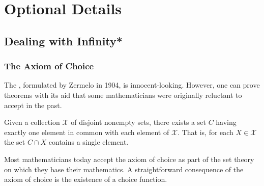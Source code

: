 \chapter{Optional Details}


\section{Dealing with Infinity*}

\subsection{The Axiom of Choice}

The , formulated by Zermelo in 1904, is innocent-looking.
However, one can prove theorems with its aid that some mathematicians were originally reluctant to accept in the past.

\begin{definition}
Given a collection $\mathcal{X}$ of disjoint nonempty sets, there exists a set $C$ having exactly one element in common with each element of $\mathcal{X}$.
That is, for each $X \in \mathcal{X}$ the set $C \cap X$ contains a single element.
\end{definition}

Most mathematicians today accept the axiom of choice as part of the set theory on which they base their mathematics.
A straightforward consequence of the axiom of choice is the existence of a choice function.

